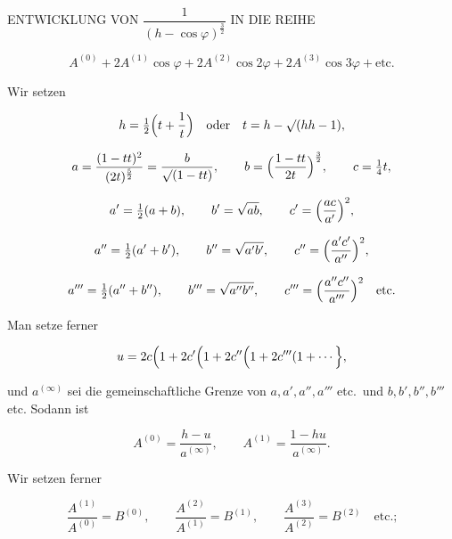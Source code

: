 \clearpage
{}%

\begin{center}
\large ENTWICKLUNG VON $\dfrac{1}{(h-\cos\varphi)^{\frac{3}{2}}}$ IN DIE REIHE
\end{center}

\[
A^{(0)}+2A^{(1)}\cos\varphi+2A^{(2)}\cos2\varphi+2A^{(3)}\cos3\varphi+\text{etc.}
\]

Wir setzen

\[
h=\tfrac{1}{2}\Bigl(t+\frac{1}{t}\Bigr)\quad\text{oder}\quad t=h-\mathord{\surd}(hh-1),
\]

\[
a=\frac{(1-tt)^2}{(2t)^{\frac{5}{2}}}=\frac{b}{\mathord{\surd}(1-tt)},\qquad
b=\Bigl(\frac{1-tt}{2t}\Bigr)^{\frac{3}{2}},\qquad
c=\tfrac{1}{4}t,
\]

\[
a'=\tfrac{1}{2}(a+b),\qquad b'=\sqrt{ab},\qquad c'=\Bigl(\frac{ac}{a'}\Bigr)^{2},
\]

\[
a''=\tfrac{1}{2}(a'+b'),\qquad b''=\sqrt{a'b'},\qquad c''=\Bigl(\frac{a'c'}{a''}\Bigr)^{2},
\]

\[
a'''=\tfrac{1}{2}(a''+b''),\qquad b'''=\sqrt{a''b''},\qquad c'''=\Bigl(\frac{a''c''}{a'''}\Bigr)^{2}\quad\text{etc.}
\]

Man setze ferner

\[
u=2c\Bigl(1+2c'\Bigl(1+2c''\Bigl(1+2c'''(1+\cdots\Bigr\},
\]

\noindent und $a^{(\infty)}$ sei die gemeinschaftliche Grenze von $a,a',a'',a'''$ etc.\ und
$b,b',b'',b'''$ etc. Sodann ist

\[
A^{(0)}=\frac{h-u}{a^{(\infty)}},\qquad A^{(1)}=\frac{1-hu}{a^{(\infty)}}.
\]

Wir setzen ferner

\[
\frac{A^{(1)}}{A^{(0)}}=B^{(0)},\qquad
\frac{A^{(2)}}{A^{(1)}}=B^{(1)},\qquad
\frac{A^{(3)}}{A^{(2)}}=B^{(2)}\quad\text{etc.;}
\]
